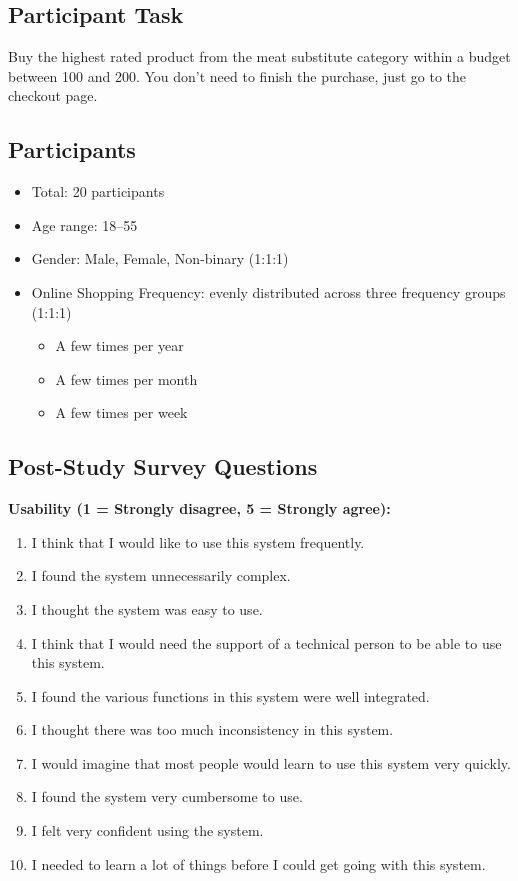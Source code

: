 \documentclass[manuscript,review,anonymous]{acmart}
\begin{document}
\subsection*{Participant Task}
Buy the highest rated product from the meat substitute category within a budget between 100 and 200. You don't need to finish the purchase, just go to the checkout page.

\subsection*{Participants}
\begin{itemize}
    \item Total: 20 participants
    \item Age range: 18--55 
    \item Gender: Male, Female, Non-binary (1:1:1)
    \item Online Shopping Frequency: evenly distributed across three frequency groups (1:1:1)
    \begin{itemize}
        \item A few times per year
        \item A few times per month
        \item A few times per week
    \end{itemize}
\end{itemize}

\subsection*{Post-Study Survey Questions}
\textbf{Usability (1 = Strongly disagree, 5 = Strongly agree):}
\begin{enumerate}
    \item I think that I would like to use this system frequently.
    \item I found the system unnecessarily complex.
    \item I thought the system was easy to use.
    \item I think that I would need the support of a technical person to be able to use this system.
    \item I found the various functions in this system were well integrated.
    \item I thought there was too much inconsistency in this system.
    \item I would imagine that most people would learn to use this system very quickly.
    \item I found the system very cumbersome to use.
    \item I felt very confident using the system.
    \item I needed to learn a lot of things before I could get going with this system.
\end{enumerate}
\end{document}

